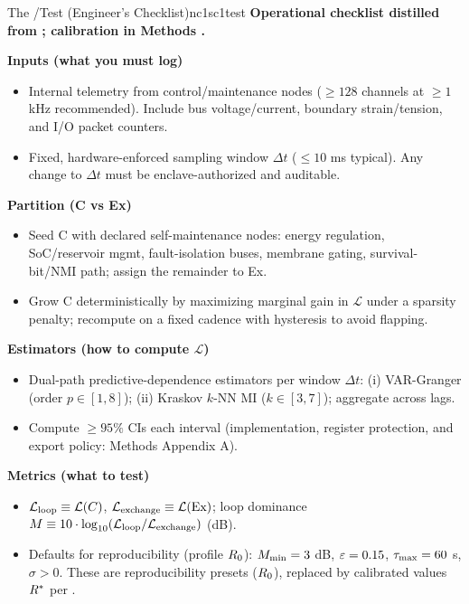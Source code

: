 \documentclass[11pt]{article}
\begin{document}
\begin{docbox}{The \NC/\SC Test (Engineer's Checklist)}{nc1sc1test}
\textbf{Operational checklist distilled from ; calibration in Methods .}

\textbf{Inputs (what you must log)}
\begin{itemize}
\item Internal telemetry from control/maintenance nodes ($\geq 128$ channels at $\geq 1$ kHz recommended). Include bus voltage/current, boundary strain/tension, and I/O packet counters.
\item Fixed, hardware-enforced sampling window $\Delta t$ ($\leq 10$ ms typical). Any change to $\Delta t$ must be enclave-authorized and auditable.
\end{itemize}

\textbf{Partition (C vs Ex)}
\begin{itemize}
\item Seed C with declared self-maintenance nodes: energy regulation, SoC/reservoir mgmt, fault-isolation buses, membrane gating, survival-bit/NMI path; assign the remainder to Ex.
\item Grow C deterministically by maximizing marginal gain in $\mathcal{L}$ under a sparsity penalty; recompute on a fixed cadence with hysteresis to avoid flapping.
\end{itemize}

\textbf{Estimators (how to compute $\mathcal{L}$)}
\begin{itemize}
\item Dual-path predictive-dependence estimators per window $\Delta t$: (i) VAR-Granger (order $p \in [1,8]$); (ii) Kraskov $k$-NN MI ($k \in [3,7]$); aggregate across lags.
\item Compute $\geq 95\%$ CIs each interval (implementation, register protection, and export policy: Methods Appendix A).
\end{itemize}

\textbf{Metrics (what to test)}
\begin{itemize}
\item $\mathcal{L}_{\text{loop}} \equiv \mathcal{L}(C)$, $\mathcal{L}_{\text{exchange}} \equiv \mathcal{L}(\text{Ex})$; loop dominance $M \equiv 10 \cdot \log_{10}(\mathcal{L}_{\text{loop}}/\mathcal{L}_{\text{exchange}})$ (dB).
\item Defaults for reproducibility (profile $R_0$): $M_{\min} = 3$ dB, $\varepsilon = 0.15$, $\tau_{\max} = 60$ s, $\sigma > 0$. These are reproducibility presets ($R_0$), replaced by calibrated values $R^*$ per .
\end{itemize}


\end{docbox}
\end{document}
